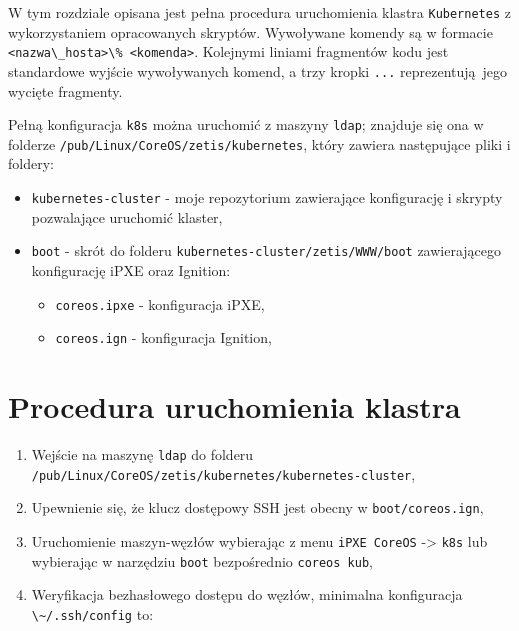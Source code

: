\documentclass[a4paper,12pt,twoside,openany]{report}
\providecommand{\tightlist}{%
  \setlength{\itemsep}{0pt}\setlength{\parskip}{0pt}}
\newcommand{\passthrough}[1]{#1}
\begin{document}
W tym rozdziale opisana jest pełna procedura uruchomienia klastra
\passthrough{\lstinline!Kubernetes!} z wykorzystaniem opracowanych
skryptów. Wywoływane komendy są w formacie
\passthrough{\lstinline!<nazwa\_hosta>\% <komenda>!}. Kolejnymi liniami
fragmentów kodu jest standardowe wyjście wywoływanych komend, a trzy
kropki \passthrough{\lstinline!...!} reprezentują~jego wycięte
fragmenty.

Pełną konfiguracja \passthrough{\lstinline!k8s!} można uruchomić z
maszyny \passthrough{\lstinline!ldap!}; znajduje się ona w folderze
\passthrough{\lstinline!/pub/Linux/CoreOS/zetis/kubernetes!}, który
zawiera następujące pliki i foldery:

\begin{itemize}
\tightlist
\item
  \passthrough{\lstinline!kubernetes-cluster!} - moje repozytorium
  zawierające konfigurację i skrypty pozwalające uruchomić klaster,
\item
  \passthrough{\lstinline!boot!} - skrót do folderu
  \passthrough{\lstinline!kubernetes-cluster/zetis/WWW/boot!}
  zawierającego konfigurację iPXE oraz Ignition:

  \begin{itemize}
  \tightlist
  \item
    \passthrough{\lstinline!coreos.ipxe!} - konfiguracja iPXE,
  \item
    \passthrough{\lstinline!coreos.ign!} - konfiguracja Ignition,
  \end{itemize}
\end{itemize}

\hypertarget{procedura-uruchomienia-klastra}{%
\section{Procedura uruchomienia
klastra}\label{procedura-uruchomienia-klastra}}

\begin{enumerate}
\def\labelenumi{\arabic{enumi}.}
\tightlist
\item
  Wejście na maszynę \passthrough{\lstinline!ldap!} do folderu
  \passthrough{\lstinline!/pub/Linux/CoreOS/zetis/kubernetes/kubernetes-cluster!},
\item
  Upewnienie się, że klucz dostępowy SSH jest obecny w
  \passthrough{\lstinline!boot/coreos.ign!},
\item
  Uruchomienie maszyn-węzłów wybierając z menu
  \passthrough{\lstinline!iPXE CoreOS!} -\textgreater{}
  \passthrough{\lstinline!k8s!} lub wybierając w narzędziu
  \passthrough{\lstinline!boot!} bezpośrednio
  \passthrough{\lstinline!coreos kub!},
\item
  Weryfikacja bezhasłowego dostępu do węzłów, minimalna konfiguracja
  \passthrough{\lstinline!\~/.ssh/config!} to:
\end{enumerate}
\end{document}
